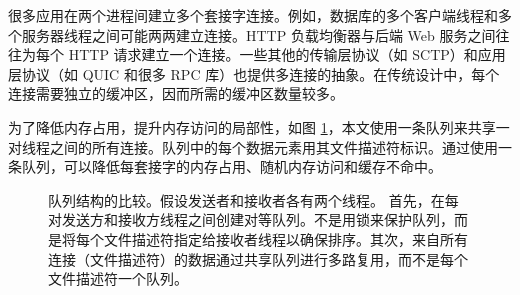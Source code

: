 很多应用在两个进程间建立多个套接字连接。例如，数据库的多个客户端线程和多个服务器线程之间可能两两建立连接。HTTP 负载均衡器与后端 Web 服务之间往往为每个 HTTP 请求建立一个连接。一些其他的传输层协议（如 SCTP）和应用层协议（如 QUIC 和很多 RPC 库）也提供多连接的抽象。在传统设计中，每个连接需要独立的缓冲区，因而所需的缓冲区数量较多。

为了降低内存占用，提升内存访问的局部性，如图 \ref{socksdirect:fig:fork-rdwr}，本文使用一条队列来共享一对线程之间的所有连接。队列中的每个数据元素用其文件描述符标识。通过使用一条队列，可以降低每套接字的内存占用、随机内存访问和缓存不命中。



\begin{figure}[htbp]
	\centering

	\caption{队列结构的比较。假设发送者和接收者各有两个线程。 首先，在每对发送方和接收方线程之间创建对等队列。不是用锁来保护队列，而是将每个文件描述符指定给接收者线程以确保排序。其次，来自所有连接（文件描述符）的数据通过共享队列进行多路复用，而不是每个文件描述符一个队列。}
	\label{socksdirect:fig:fork-rdwr}
\end{figure}

